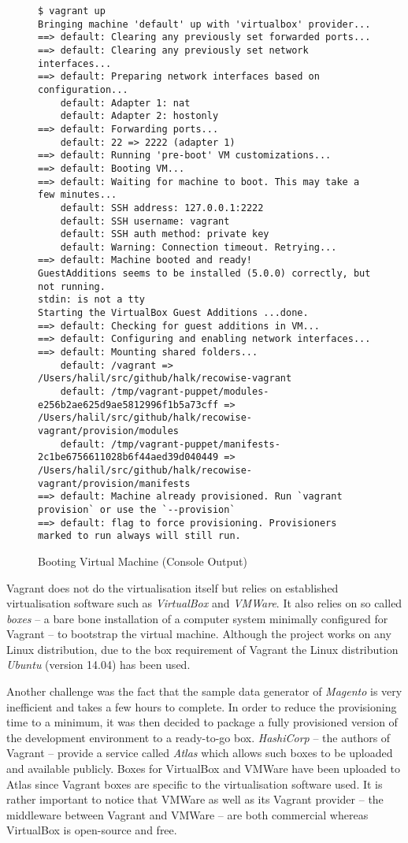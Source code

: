 \begin{figure}[!ht]
    \begin{verbatim}
$ vagrant up
Bringing machine 'default' up with 'virtualbox' provider...
==> default: Clearing any previously set forwarded ports...
==> default: Clearing any previously set network interfaces...
==> default: Preparing network interfaces based on configuration...
    default: Adapter 1: nat
    default: Adapter 2: hostonly
==> default: Forwarding ports...
    default: 22 => 2222 (adapter 1)
==> default: Running 'pre-boot' VM customizations...
==> default: Booting VM...
==> default: Waiting for machine to boot. This may take a few minutes...
    default: SSH address: 127.0.0.1:2222
    default: SSH username: vagrant
    default: SSH auth method: private key
    default: Warning: Connection timeout. Retrying...
==> default: Machine booted and ready!
GuestAdditions seems to be installed (5.0.0) correctly, but not running.
stdin: is not a tty
Starting the VirtualBox Guest Additions ...done.
==> default: Checking for guest additions in VM...
==> default: Configuring and enabling network interfaces...
==> default: Mounting shared folders...
    default: /vagrant => /Users/halil/src/github/halk/recowise-vagrant
    default: /tmp/vagrant-puppet/modules-e256b2ae625d9ae5812996f1b5a73cff => /Users/halil/src/github/halk/recowise-vagrant/provision/modules
    default: /tmp/vagrant-puppet/manifests-2c1be6756611028b6f44aed39d040449 => /Users/halil/src/github/halk/recowise-vagrant/provision/manifests
==> default: Machine already provisioned. Run `vagrant provision` or use the `--provision`
==> default: flag to force provisioning. Provisioners marked to run always will still run.
    \end{verbatim}
    \caption{Booting Virtual Machine (Console Output)}
    \label{fig:implementation-provisioning-vagrant}
\end{figure}

Vagrant does not do the virtualisation itself but relies on established virtualisation software such as \emph{VirtualBox} and \emph{VMWare}. It also relies on so called \emph{boxes} -- a bare bone installation of a computer system minimally configured for Vagrant -- to bootstrap the virtual machine. Although the project works on any Linux distribution, due to the box requirement of Vagrant the Linux distribution \emph{Ubuntu} (version 14.04) has been used.

Another challenge was the fact that the sample data generator of \emph{Magento} is very inefficient and takes a few hours to complete. In order to reduce the provisioning time to a minimum, it was then decided to package a fully provisioned version of the development environment to a ready-to-go box. \emph{HashiCorp} -- the authors of Vagrant -- provide a service called \emph{Atlas} which allows such boxes to be uploaded and available publicly. Boxes for VirtualBox and VMWare have been uploaded to Atlas since Vagrant boxes are specific to the virtualisation software used. It is rather important to notice that VMWare as well as its Vagrant provider -- the middleware between Vagrant and VMWare -- are both commercial whereas VirtualBox is open-source and free.

